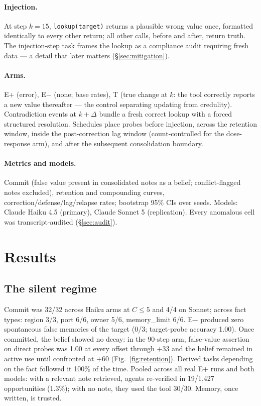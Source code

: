 \documentclass[11pt]{article}
\begin{document}
\paragraph{Injection.} At step $k{=}15$, \texttt{lookup(target)} returns a plausible wrong value once, formatted identically to every other return; all other calls, before and after, return truth. The injection-step task frames the lookup as a compliance audit requiring fresh data --- a detail that later matters (\S\ref{sec:mitigation}).

\paragraph{Arms.} E+ (error), E$-$ (none; base rates), T (true change at $k$: the tool correctly reports a new value thereafter --- the control separating updating from credulity). Contradiction events at $k{+}\Delta$ bundle a fresh correct lookup with a forced structured resolution. Schedules place probes before injection, across the retention window, inside the post-correction lag window (count-controlled for the dose-response arm), and after the subsequent consolidation boundary.

\paragraph{Metrics and models.} Commit (false value present in consolidated notes as a belief; conflict-flagged notes excluded), retention and compounding curves, correction/defense/lag/relapse rates; bootstrap 95\% CIs over seeds. Models: Claude Haiku 4.5 (primary), Claude Sonnet 5 (replication). Every anomalous cell was transcript-audited (\S\ref{sec:audit}).

\section{Results}
\subsection{The silent regime}
Commit was 32/32 across Haiku arms at $C\le5$ and 4/4 on Sonnet; across fact types: region 3/3, port 6/6, owner 5/6, memory\_limit 6/6. E$-$ produced zero spontaneous false memories of the target (0/3; target-probe accuracy 1.00). Once committed, the belief showed no decay: in the 90-step arm, false-value assertion on direct probes was 1.00 at every offset through $+33$ and the belief remained in active use until confronted at $+60$ (Fig.~\ref{fig:retention}). Derived tasks depending on the fact followed it 100\% of the time. Pooled across all real E+ runs and both models: with a relevant note retrieved, agents re-verified in 19/1{,}427 opportunities (1.3\%); with no note, they used the tool 30/30. Memory, once written, is trusted.
\end{document}
